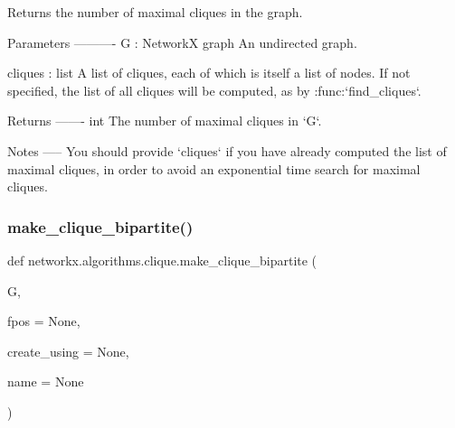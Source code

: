 \begin{DoxyVerb}Returns the number of maximal cliques in the graph.

Parameters
----------
G : NetworkX graph
    An undirected graph.

cliques : list
    A list of cliques, each of which is itself a list of nodes. If
    not specified, the list of all cliques will be computed, as by
    :func:`find_cliques`.

Returns
-------
int
    The number of maximal cliques in `G`.

Notes
-----
You should provide `cliques` if you have already computed the list
of maximal cliques, in order to avoid an exponential time search for
maximal cliques.\end{DoxyVerb}
 \mbox{\label{namespacenetworkx_1_1algorithms_1_1clique_a866d9770533ac4a124b03e7c8adfc3d1}} 
\subsubsection{\texorpdfstring{make\+\_\+clique\+\_\+bipartite()}{make\_clique\_bipartite()}}
{\footnotesize\ttfamily def networkx.\+algorithms.\+clique.\+make\+\_\+clique\+\_\+bipartite (\begin{DoxyParamCaption}\item[{}]{G,  }\item[{}]{fpos = {\ttfamily None},  }\item[{}]{create\+\_\+using = {\ttfamily None},  }\item[{}]{name = {\ttfamily None} }\end{DoxyParamCaption})}

